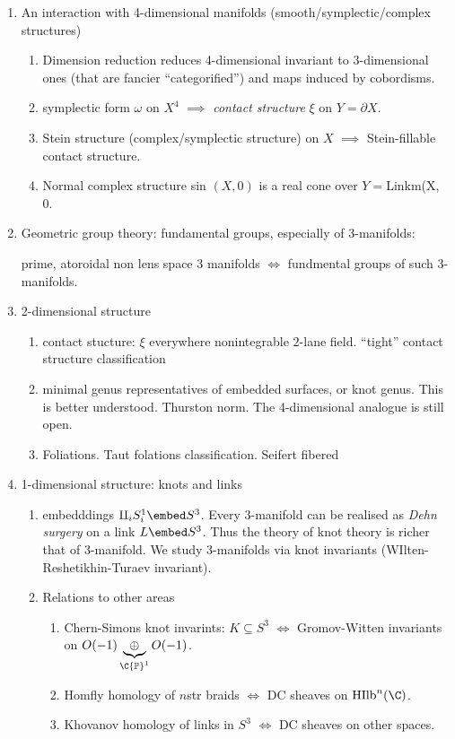 \documentclass[a4paper]{article}
\renewcommand{\boundary}{\partial}
\renewcommand{\b}{\boundary}
\renewcommand{\P}{{\mathbb P}}
\begin{document}
\begin{enumerate}
\item An interaction with 4-dimensional manifolds (smooth/symplectic/complex structures)
\begin{enumerate}
\item Dimension reduction reduces 4-dimensional invariant to 3-dimensional ones (that are fancier ``categorified'') and maps induced by cobordisms.
\item symplectic form \(\omega\) on \(X^4\) \(\implies\) \emph{contact structure} \(\xi\) on \(Y = \b X\).
\item Stein structure (complex/symplectic structure) on \(X\) \(\implies\) Stein-fillable contact structure.
\item Normal complex structure sin \((X, 0)\) is a real cone over \(Y = \)Linkm(X, 0.
\end{enumerate}

\item Geometric group theory: fundamental groups, especially of 3-manifolds:

prime, atoroidal non lens space 3 manifolds \(\iff\) fundmental groups of such 3-manifolds.

\item 2-dimensional structure
  \begin{enumerate}
  \item contact stucture: \(\xi\) everywhere nonintegrable \(2\)-lane field. ``tight'' contact structure classification
  \item minimal genus representatives of embedded surfaces, or knot genus. This is better understood. Thurston norm. The 4-dimensional analogue is still open.
  \item Foliations. Taut folations classification. Seifert fibered
  \end{enumerate}

\item 1-dimensional structure: knots and links
  \begin{enumerate}
  \item embedddings \(\amalg_i S^1_i \embed S^3\). Every 3-manifold can be realised as \emph{Dehn surgery} on  a link \(L \embed S^3\). Thus the theory of knot theory is richer that of 3-manifold. We study 3-manifolds via knot invariants (WIlten-Reshetikhin-Turaev invariant).
  \item Relations to other areas
    \begin{enumerate}
    \item Chern-Simons knot invarints: \(K \subseteq S^3\) \(\iff\) Gromov-Witten invariants on \(O(-1) \underbrace{\oplus}_{\C\P^1} O(-1)\).
    \item Homfly homology of \(n\)str braids \(\iff\) DC sheaves on \(\operatorname{HIlb}^n(\C)\).
    \item Khovanov homology of links in \(S^3\) \(\iff\) DC sheaves on other spaces.
    \end{enumerate}
  \end{enumerate}
\end{enumerate}
\end{document}

